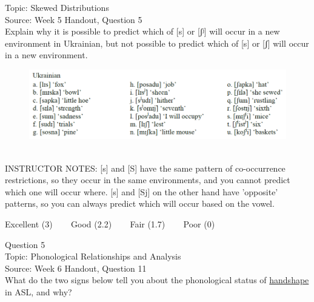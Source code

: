 \documentclass[12pt]{article}
\begin{document}
Topic: Skewed Distributions\\
Source: Week 5 Handout, Question 5\\

Explain why it is possible to predict which of [s] or [ʃʲ] will occur in a new environment in Ukrainian, but not possible to predict which of [s] or [ʃ] will occur in a new environment.\\

\begin{figure}[H]
\includegraphics{../images/ukrainian.png}
\end{figure}

~\\
INSTRUCTOR NOTES: [s] and [S] have the same pattern of co-occurrence restrictions, so they occur in the same environments, and you cannot predict which one will occur where. [s] and [Sj] on the other hand have 'opposite' patterns, so you can always predict which will occur based on the vowel.


\vfill
Excellent (3) ~~~ Good (2.2) ~~~ Fair (1.7) ~~~ Poor (0)
\newpage

{\large Question 5}\\

Topic: Phonological Relationships and Analysis\\
Source: Week 6 Handout, Question 11\\

What do the two signs below tell you about the phonological status of \underline{handshape} in ASL, and why?\\
\end{document}

